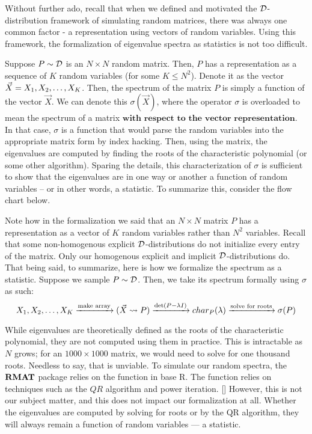 Without further ado, recall that when we defined and motivated the $\D$-distribution framework of simulating random matrices, there was always one common factor - a representation using vectors of random variables.
Using this framework, the formalization of eigenvalue spectra as statistics is not too difficult.

\begin{formalization}
Suppose $P \sim \D$ is an $N \times N$ random matrix.
Then, $P$ has a representation as a sequence of $K$ random variables (for some $K \leq N^2$).
Denote it as the vector $\vec{X} = \seqo[K]{X}$.
Then, the spectrum of the matrix $P$ is simply a function of the vector $\vec{X}$.
We can denote this $\sigma(\vec{X})$, where the operator $\sigma$ is overloaded to mean the spectrum of a matrix $\textbf{with respect to the vector representation}$.
In that case, $\sigma$ is a function that would parse the random variables into the appropriate matrix form by index hacking.
Then, using the matrix, the eigenvalues are computed by finding the roots of the characteristic polynomial (or some other algorithm).
Sparing the details, this characterization of $\sigma$ is sufficient to show that the eigenvalues are in one way or another a function of random variables -- or in other words, a statistic.
To summarize this, consider the flow chart below.
\end{formalization}

Note how in the formalization we said that an $N \times N$ matrix $P$ has a representation as a vector of $K$ random variables rather than $N^2$ variables.
Recall that some non-homogenous explicit $\D$-distributions do not initialize every entry of the matrix. Only our homogenous explicit and implicit $\D$-distributions do.
That being said, to summarize, here is how we formalize the spectrum as a statistic. Suppose we sample $P \sim \D$. Then, we take its spectrum formally using $\sigma$ as such:\hfill
$$ X_1,X_2,\dots,X_K \xra{\text{make array}} (\vec{X} \rightsquigarrow P) \xra{\det(P - \lambda I)} char_{P}(\lambda) \xra{\text{solve for roots}} \sigma(P) $$

\begin{remark}[Computation]
While eigenvalues are theoretically defined as the roots of the characteristic polynomial, they are not computed using them in practice.
This is intractable as $N$ grows; for an $1000 \times 1000$ matrix, we would need to solve for one thousand roots.
Needless to say, that is unviable.
To simulate our random spectra, the $\RMAT$ package relies on the  function in base R.
The function relies on techniques such as the $QR$ algorithm and power iteration. [\cite{qr}]
However, this is not our subject matter, and this does not impact our formalization at all.
Whether the eigenvalues are computed by solving for roots or by the QR algorithm, they will always remain a function of random variables --- a statistic.
\end{remark}



